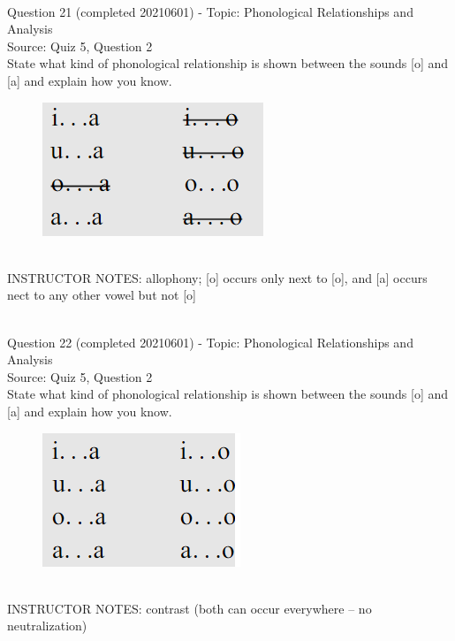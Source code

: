 \documentclass[12pt]{article}
\begin{document}
~\\

{\large Question 21} (completed 20210601) - Topic: Phonological Relationships and Analysis\\
Source: Quiz 5, Question 2\\

State what kind of phonological relationship is shown between the sounds [o] and [a] and explain how you know.\\

\begin{figure}[H]
\includegraphics{../images/peng70ao_c.png}
\end{figure}

~\\
INSTRUCTOR NOTES: allophony; [o] occurs only next to [o], and [a] occurs nect to any other vowel but not [o]


~\\

{\large Question 22} (completed 20210601) - Topic: Phonological Relationships and Analysis\\
Source: Quiz 5, Question 2\\

State what kind of phonological relationship is shown between the sounds [o] and [a] and explain how you know.\\

\begin{figure}[H]
\includegraphics{../images/peng70ao_d.png}
\end{figure}

~\\
INSTRUCTOR NOTES: contrast (both can occur everywhere -- no neutralization)
\end{document}
